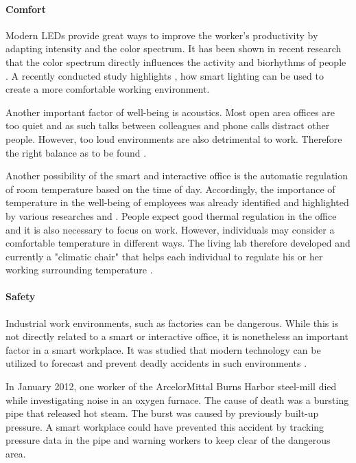 \paragraph{Comfort}
\label{sec:sda-comfort}
Modern LEDs provide great ways to improve the worker's productivity by adapting intensity and the 
color spectrum. It has been shown in recent research that the color spectrum directly influences the 
activity and biorhythms of people \cite{living-lab}. A recently conducted study highlights \cite{iotagenda}, how smart 
lighting can be used to create a more comfortable working environment.

Another important factor of well-being is acoustics. Most open area offices are too quiet and as 
such talks between colleagues and phone calls distract other people. However, too loud environments 
are also detrimental to work. Therefore the right balance as to be found \cite{living-lab}. 

Another possibility of the smart and interactive office is the automatic regulation of room 
temperature based on the time of day. Accordingly, the importance of temperature in the well-being of employees was already identified and highlighted by various researches \cite{iotagenda} and \cite{living-lab}. People expect good thermal regulation in 
the office and it is also necessary to focus on work. However, individuals may consider a comfortable temperature in different ways. The living lab therefore developed and currently a "climatic chair" that helps each 
individual to regulate his or her working surrounding temperature \cite{living-lab}.

\paragraph{Safety}
\label{sec:sda-safety}
Industrial work environments, such as factories can be dangerous. While this is not directly related to a smart 
or interactive office, it is nonetheless an important factor in a smart workplace. 
It was studied that modern technology can be utilized to forecast and prevent deadly accidents in such environments \cite{sda-wired} .

In January 2012, one worker of the ArcelorMittal Burns Harbor steel-mill died while investigating 
noise in an oxygen furnace. The cause of death was a bursting pipe that released hot steam. The 
burst was caused by previously built-up pressure. A smart workplace could have prevented this 
accident by tracking pressure data in the pipe and warning workers to keep clear of the dangerous 
area. \cite{sda-wired} 

